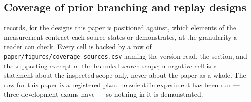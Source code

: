 \subsection{Coverage of prior branching and replay designs}
\label{app:coverage}

 records, for the designs this paper is positioned against,
which elements of the measurement contract each source states or demonstrates,
at the granularity a reader can check.  Every cell is backed by a row of
\texttt{paper/figures/coverage\_sources.csv} naming the version read, the
section, and the supporting excerpt or the bounded search scope; a negative cell
is a statement about the inspected scope only, never about the paper as a
whole.  The row for this paper is a registered plan: no scientific experiment has been
run --- three development exams have --- so nothing in it is demonstrated.

